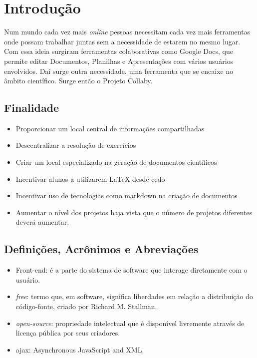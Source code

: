 \section{Introdução}

Num mundo cada vez mais \emph{online} pessoas necessitam cada vez mais
ferramentas onde possam trabalhar juntas sem a necessidade de estarem no
mesmo lugar. Com essa ideia surgiram ferramentas colaborativas como
Google Docs, que permite editar Documentos, Planilhas e Apresentações
com vários usuários envolvidos. Daí surge outra necessidade, uma
ferramenta que se encaixe no âmbito científico. Surge então o Projeto
Collaby.

\subsection{Finalidade}

\begin{itemize}
\item
  Proporcionar um local central de informações compartilhadas
\item
  Descentralizar a resolução de exercícios
\item
  Criar um local especializado na geração de documentos científicos
\item
  Incentivar alunos a utilizarem LaTeX desde cedo
\item
  Incentivar uso de tecnologias como markdown na criação de documentos
\item
  Aumentar o nível dos projetos haja vista que o número de projetos
  diferentes deverá aumentar.
\end{itemize}
\subsection{Definições, Acrônimos e Abreviações}

\begin{itemize}
\item
  Front-end: é a parte do sistema de software que interage diretamente
  com o usuário.
\item
  \emph{free}: termo que, em software, significa liberdades em relação a
  distribuição do código-fonte, criado por Richard M. Stallman.
\item
  \emph{open-source}: propriedade intelectual que é disponível
  livremente através de licença pública por seus criadores.
\item
  ajax: Asynchronous JavaScript and XML.
\end{itemize}
